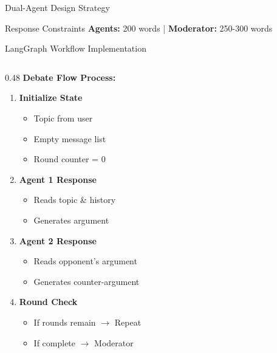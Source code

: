 \documentclass[aspectratio=169]{beamer}
\begin{document}
\begin{frame}{Dual-Agent Design Strategy}
    \vspace{0.2cm}
    
    \begin{alertblock}{Response Constraints}
        \centering
        \footnotesize \textbf{Agents:} 200 words | \textbf{Moderator:} 250-300 words
    \end{alertblock}
\end{frame}

\begin{frame}{LangGraph Workflow Implementation}
    \begin{columns}
        \begin{column}{0.48\textwidth}
            \textbf{Debate Flow Process:}
            \begin{enumerate}
                \small
                \item \textbf{Initialize State}
                \begin{itemize}
                    \footnotesize
                    \item Topic from user
                    \item Empty message list
                    \item Round counter = 0
                \end{itemize}
                
                \item \textbf{Agent 1 Response}
                \begin{itemize}
                    \footnotesize
                    \item Reads topic \& history
                    \item Generates argument
                \end{itemize}
                
                \item \textbf{Agent 2 Response}
                \begin{itemize}
                    \footnotesize
                    \item Reads opponent's argument
                    \item Generates counter-argument
                \end{itemize}
                
                \item \textbf{Round Check}
                \begin{itemize}
                    \footnotesize
                    \item If rounds remain $\rightarrow$ Repeat
                    \item If complete $\rightarrow$ Moderator
                \end{itemize}
            \end{enumerate}
        \end{column}
        

\end{columns}
\end{frame}
\end{document}

